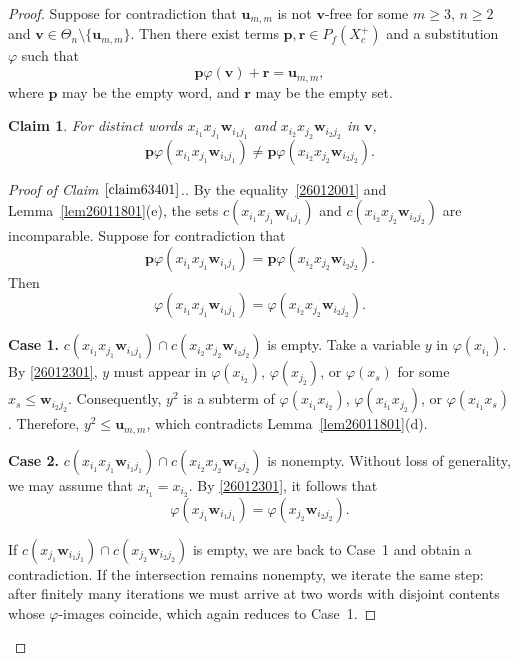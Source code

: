 \documentclass[reqno]{amsart}
\theoremstyle{plain}
\newtheorem{claim}{Claim}[section]
\theoremstyle{definition}
\newcommand{\bp}{\mathbf{p}}
\newcommand{\br}{\mathbf{r}}
\newcommand{\bu}{\mathbf{u}}
\newcommand{\bv}{\mathbf{v}}
\newcommand{\bw}{\mathbf{w}}
\begin{document}
\begin{proof}
Suppose for contradiction that $\bu_{m, m}$ is not $\bv$-free for some
$m\geq 3$, $n \geq 2$ and $\bv\in \Theta_n \setminus \{\bu_{m,m}\}$.
Then there exist terms $\bp, \br\in P_f(X_c^+)$ and a substitution $\varphi$ such that
\begin{equation}\label{26012001}
\bp\varphi(\bv)+\br=\bu_{m,m},
\end{equation}
where $\bp$ may be the empty word, and $\br$ may be the empty set.

\begin{claim}\label{claim63401}
For distinct words $x_{i_1}x_{j_1}\bw_{i_1j_1}$ and $x_{i_2}x_{j_2}\bw_{i_2j_2}$ in $\bv$,
\[
\bp\varphi(x_{i_1}x_{j_1}\bw_{i_1j_1})\neq\bp\varphi(x_{i_2}x_{j_2}\bw_{i_2j_2}).
\]
\end{claim}
\begin{proof}[Proof of Claim $\ref{claim63401}$.]
By the equality~\eqref{26012001} and Lemma~\ref{lem26011801}(e),
the sets $c(x_{i_1}x_{j_1}\bw_{i_1j_1})$ and $c(x_{i_2}x_{j_2}\bw_{i_2j_2})$ are incomparable.
Suppose for contradiction that
\[
\bp\varphi(x_{i_1}x_{j_1}\bw_{i_1j_1})=\bp\varphi(x_{i_2}x_{j_2}\bw_{i_2j_2}).
\]
Then
\begin{equation}\label{26012301}
\varphi(x_{i_1}x_{j_1}\bw_{i_1j_1})=\varphi(x_{i_2}x_{j_2}\bw_{i_2j_2}).
\end{equation}

\textbf{Case 1.} $c(x_{i_1}x_{j_1}\bw_{i_1j_1})\cap c(x_{i_2}x_{j_2}\bw_{i_2j_2})$ is empty.
Take a variable $y$ in $\varphi(x_{i_1})$. By \eqref{26012301}, $y$ must appear in
$\varphi(x_{i_2})$, $\varphi(x_{j_2})$, or $\varphi(x_s)$ for some $x_s\leq \bw_{i_2j_2}$.
Consequently, $y^2$ is a subterm of
$\varphi(x_{i_1}x_{i_2})$, $\varphi(x_{i_1}x_{j_2})$, or $\varphi(x_{i_1}x_s)$.
Therefore, $y^2\leq \bu_{m, m}$, which contradicts Lemma~\ref{lem26011801}(d).

\textbf{Case 2.} $c(x_{i_1}x_{j_1}\bw_{i_1j_1})\cap c(x_{i_2}x_{j_2}\bw_{i_2j_2})$ is nonempty.
Without loss of generality, we may assume that $x_{i_1}=x_{i_2}$.
By \eqref{26012301}, it follows that
\[
\varphi(x_{j_1}\bw_{i_1j_1})=\varphi(x_{j_2}\bw_{i_2j_2}).
\]

If $c(x_{j_1}\bw_{i_1j_1})\cap c(x_{j_2}\bw_{i_2j_2})$ is empty,
we are back to Case~1 and obtain a contradiction.
If the intersection remains nonempty,
we iterate the same step: after finitely many iterations
we must arrive at two words with disjoint contents whose $\varphi$-images coincide, which again reduces to Case~1.
\end{proof}


\end{proof}
\end{document}
